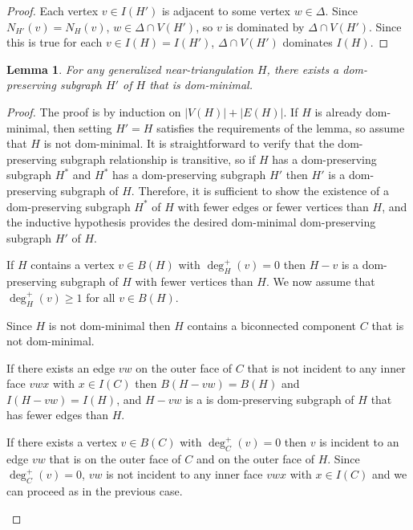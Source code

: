 \documentclass[12pt]{article}
\newtheorem{lem}{Lemma}
\begin{document}
\begin{proof}
  Each vertex $v\in I(H')$ is adjacent to some vertex $w\in \Delta$.  Since $N_{H'}(v)=N_H(v)$, $w\in\Delta\cap V(H')$, so $v$ is dominated by $\Delta\cap V(H')$.  Since this is true for each $v\in I(H)=I(H')$, $\Delta\cap V(H')$ dominates $I(H)$.    
\end{proof}

\begin{lem}\label{dom-minimal}
  For any generalized near-triangulation $H$, there exists a dom-preserving subgraph $H'$ of $H$ that is dom-minimal. 
\end{lem}

\begin{proof}
  The proof is by induction on $|V(H)|+|E(H)|$.  If $H$ is already dom-minimal, then setting $H'=H$ satisfies the requirements of the lemma, so assume that $H$ is not dom-minimal.  It is straightforward to verify that the dom-preserving subgraph relationship is transitive, so if $H$ has a dom-preserving subgraph $H^*$ and $H^*$ has a dom-preserving subgraph $H'$ then $H'$ is a dom-preserving subgraph of $H$.  Therefore, it is sufficient to show the existence of a dom-preserving subgraph $H^*$ of $H$ with fewer edges or fewer vertices than $H$, and the inductive hypothesis provides the desired dom-minimal dom-preserving subgraph $H'$ of $H$.
  
  If $H$ contains a vertex $v\in B(H)$ with $\deg^+_H(v)=0$ then $H-v$ is a dom-preserving subgraph of $H$ with fewer vertices than $H$.  We now assume that $\deg^+_H(v)\ge 1$ for all $v\in B(H)$.
  
  Since $H$ is not dom-minimal then $H$ contains a biconnected component $C$ that is not dom-minimal.  
  \begin{compactenum}
    \item If there exists an edge $vw$ on the outer face of $C$ that is not incident to any inner face $vwx$ with $x\in I(C)$ then $B(H-vw)=B(H)$ and $I(H-vw)=I(H)$, and $H-vw$ is a is dom-preserving subgraph of $H$ that has fewer edges than $H$.

    \item If there exists a vertex $v\in B(C)$ with $\deg^+_C(v)=0$ then $v$ is incident to an edge $vw$ that is on the outer face of $C$ and on the outer face of $H$. Since $\deg^+_C(v)=0$, $vw$ is not incident to any inner face $vwx$ with $x\in I(C)$ and we can proceed as in the previous case. \qedhere
  \end{compactenum}
\end{proof}
\end{document}
